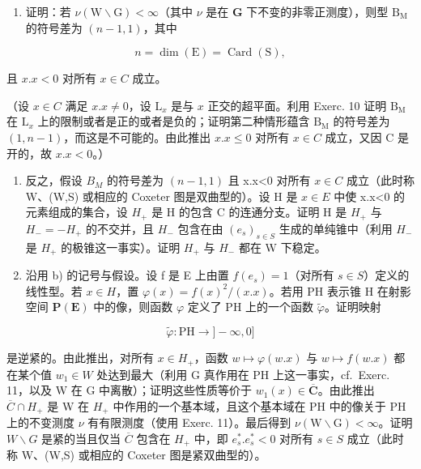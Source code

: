 \begin{enumerate}
\def\labelenumi{\alph{enumi})}
\tightlist
\item
  证明：若 \(\nu (\mathrm{W}\backslash \mathrm{G}) < \infty\)（其中 \(\nu\) 是在 \(\mathbf{G}\) 下不变的非零正测度），则型 \(\mathrm{B_M}\) 的符号差为 \((n - 1,1)\)，其中
\end{enumerate}

\[
n = \dim (\mathrm{E}) = \operatorname{Card} (\mathrm{S}),
\]

且 \(x.x < 0\) 对所有 \(x \in C\) 成立。

（设 \(x \in C\) 满足 \(x.x \neq 0\)，设 \(\mathrm{L}_x\) 是与 \(x\) 正交的超平面。利用 Exerc. 10 证明 \(\mathrm{B}_{\mathrm{M}}\) 在 \(\mathrm{L}_x\) 上的限制或者是正的或者是负的；证明第二种情形蕴含 \(\mathrm{B}_{\mathrm{M}}\) 的符号差为 \((1, n - 1)\)，而这是不可能的。由此推出 \(x.x \leqslant 0\) 对所有 \(x \in C\) 成立，又因 C 是开的，故 \(x.x < 0\)。）

\begin{enumerate}
\def\labelenumi{\alph{enumi})}
\setcounter{enumi}{1}
\item
  反之，假设 \(B_{M}\) 的符号差为 \((n-1,1)\) 且 x.x\textless0 对所有 \(x\in C\) 成立（此时称 W、(W,S) 或相应的 Coxeter 图是双曲型的）。设 H 是 \(x\in E\) 中使 x.x\textless0 的元素组成的集合，设 \(H_{+}\) 是 H 的包含 C 的连通分支。证明 H 是 \(H_{+}\) 与 \(H_{-}=-H_{+}\) 的不交并，且 \(H_{-}\) 包含在由 \((e_{s})_{s\in S}\) 生成的单纯锥中（利用 \(H_{-}\) 是 \(H_{+}\) 的极锥这一事实）。证明 \(H_{+}\) 与 \(H_{-}\) 都在 W 下稳定。
\item
  沿用 b) 的记号与假设。设 f 是 E 上由置 \(f(e_{s}) = 1\)（对所有 \(s \in S\)）定义的线性型。若 \(x \in H\)，置 \(\varphi(x) = f(x)^{2}/(x.x)\)。若用 PH 表示锥 H 在射影空间 \(\mathbf{P}(\mathbf{E})\) 中的像，则函数 \(\varphi\) 定义了 PH 上的一个函数 \(\tilde{\varphi}\)。证明映射
\end{enumerate}

\[
\left. \tilde {\varphi}: \mathrm{PH} \rightarrow ] - \infty , 0 ] \right.
\]

是逆紧的。由此推出，对所有 \(x \in H_{+}\)，函数 \(w \mapsto \varphi(w.x)\) 与 \(w \mapsto f(w.x)\) 都在某个值 \(w_{1} \in W\) 处达到最大（利用 G 真作用在 PH 上这一事实，cf.~Exerc. 11，以及 W 在 G 中离散）；证明这些性质等价于 \(w_{1}(x) \in \overline{\mathbf{C}}\)。由此推出 \(\overline{C} \cap H_{+}\) 是 W 在 \(H_{+}\) 中作用的一个基本域，且这个基本域在 PH 中的像关于 PH 上的不变测度 \(\nu\) 有有限测度（使用 Exerc. 11）。最后得到 \(\nu(\mathrm{W} \backslash \mathrm{G}) < \infty\)。证明 \(W \backslash G\) 是紧的当且仅当 \(\overline{C}\) 包含在 \(H_{+}\) 中，即 \(e_{s}^{*}.e_{s}^{*} < 0\) 对所有 \(s \in S\) 成立（此时称 W、(W,S) 或相应的 Coxeter 图是紧双曲型的）。

